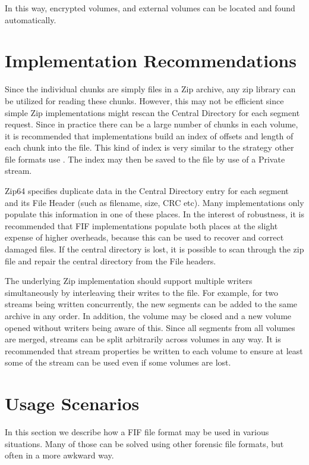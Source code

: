 \documentclass[10pt, conference]{IEEEtran}
\begin{document}
In this way, encrypted volumes, and external volumes can be located
and found automatically.


\section{Implementation Recommendations}
Since the individual chunks are simply files in a Zip archive, any zip
library can be utilized for reading these chunks. However, this may
not be efficient since simple Zip implementations might rescan the
Central Directory for each segment request. Since in practice there
can be a large number of chunks in each volume, it is recommended that
implementations build an index of offsets and length of each chunk
into the file. This kind of index is very similar to the strategy
other file formats use \cite{EWF}. The index may then be saved to the
file by use of a Private stream.

Zip64 specifies duplicate data in the Central Directory entry for each
segment and its File Header (such as filename, size, CRC etc). Many
implementations only populate this information in one of these
places. In the interest of robustness, it is recommended that FIF
implementations populate both places at the slight expense of higher
overheads, because this can be used to recover and correct damaged
files. If the central directory is lost, it is possible to scan
through the zip file and repair the central directory from the File
headers.

The underlying Zip implementation should support multiple writers
simultaneously by interleaving their writes to the file. For example,
for two streams being written concurrently, the new segments can be
added to the same archive in any order. In addition, the volume may be
closed and a new volume opened without writers being aware of
this. Since all segments from all volumes are merged, streams can be
split arbitrarily across volumes in any way. It is recommended that
stream properties be written to each volume to ensure at least some of
the stream can be used even if some volumes are lost.

\section{Usage Scenarios}
In this section we describe how a FIF file format may be used in
various situations. Many of those can be solved using other forensic
file formats, but often in a more awkward way.
\end{document}
